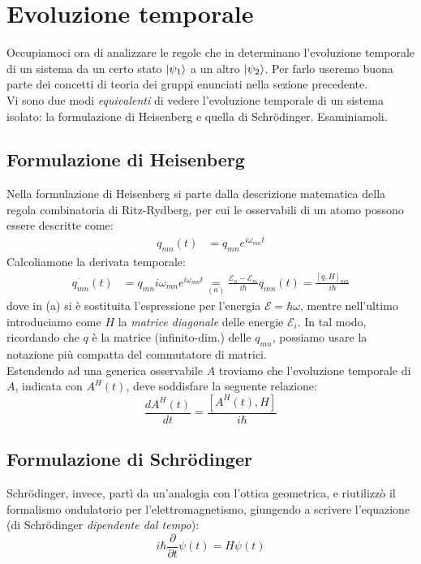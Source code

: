 \documentclass[../../FisicaTeorica.tex]{subfiles}
\begin{document}
\section{Evoluzione temporale}
\label{sec:time-evolution}
Occupiamoci ora di analizzare le regole che in \MQ determinano l'evoluzione temporale di un sistema da un certo stato $\Ket{\psi_1}$ a un altro $\Ket{\psi_2}$. Per farlo useremo buona parte dei concetti di teoria dei gruppi enunciati nella sezione precedente.\\
Vi sono due modi \textit{equivalenti} di vedere l'evoluzione temporale di un sistema isolato: la formulazione di Heisenberg e quella di Schr\"odinger. Esaminiamoli.

\subsection{Formulazione di Heisenberg}
Nella formulazione di Heisenberg si parte dalla descrizione matematica della regola combinatoria di Ritz-Rydberg, per cui le osservabili di un atomo possono essere descritte come:
\begin{align*}
q_{mn}\left(t\right)&=q_{mn}e^{i\omega_{mn}t}
\end{align*}
Calcoliamone la derivata temporale:
\begin{align*}
\dot{q_{mn}}\left(t\right)&=q_{mn} i\omega_{mn}e^{i\omega_{mn}t}\underset{(a)}{=}
\frac{\mathcal{E}_n-\mathcal{E}_m}{i\hbar}q_{mn}\left(t\right)=\frac{\left[q,H\right]_{mn}}{i\hbar}
\end{align*}
dove in (a) si è sostituita l'espressione per l'energia $\mathcal{E}=\hbar \omega$, mentre nell'ultimo introduciamo come $H$ la \textit{matrice diagonale} delle energie $\mathcal{E}_i$. In tal modo, ricordando che $q$ è la matrice (infinito-dim.) delle $q_{mn}$, possiamo usare la notazione più compatta del commutatore di matrici.\\
Estendendo ad una generica osservabile $A$ troviamo che l'evoluzione temporale di $A$, indicata con $A^H\left(t\right)$, deve soddisfare la seguente relazione:
\[
\frac{dA^H(t)}{dt}=\frac{[A^H(t), H]}{i\hbar}
\]
\subsection{Formulazione di Schrödinger}
Schrödinger, invece, partì da un'analogia con l'ottica geometrica, e riutilizzò il formalismo ondulatorio per l'elettromagnetismo, giungendo a scrivere l'equazione (di Schr\"odinger \textit{dipendente dal tempo}):
\[
i\hbar \frac{\partial}{\partial t} \psi(t) = H\psi(t)
\]
\end{document}
